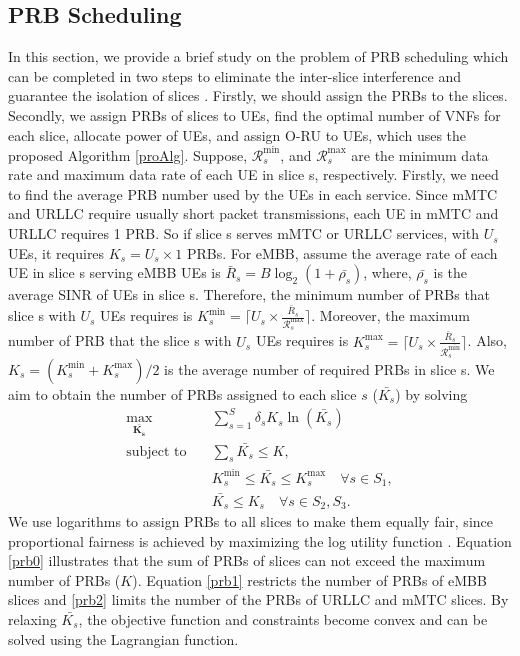 \documentclass[lettersize,journal]{IEEEtran}
\begin{document}
\subsection{PRB Scheduling}\label{prb}
\vspace{-1mm}
In this section, we provide a brief study on the problem of PRB scheduling which can be completed in two steps to eliminate the inter-slice interference and guarantee the isolation of slices \cite{marabissi2019highly}.
Firstly, we should assign the PRBs to the slices. Secondly, we assign PRBs of slices to UEs, find the optimal number of VNFs for each slice, allocate power of UEs, and assign O-RU to UEs, which uses the proposed Algorithm \ref{proAlg}.
Suppose, $\mathcal{R}_{{s}}^{\min}$, and $\mathcal{R}_{{s}}^{\text{max}}$ are the minimum data rate and maximum data rate of each UE in slice s, respectively.
Firstly, we need to find the average PRB number used by the UEs in each service. Since mMTC and URLLC require usually short packet transmissions, each UE in mMTC and URLLC requires 1 PRB. So if slice s serves mMTC or URLLC services, with $U_s$ UEs, it requires $K_s = U_s \times 1$ PRBs. For eMBB, assume the average rate of each UE in slice s serving eMBB UEs is $\bar{R}_s = B\log_2(1 + \bar{\rho_s})$, where, $\bar{\rho_s}$ is the average SINR of UEs in slice s. 
Therefore, the minimum number of PRBs that slice s with $U_s$ UEs requires is $K_s^{\min} = \lceil{U_s \times \frac{\bar{R}_s}{\mathcal{R}_{{s}}^{\text{max}}}}\rceil$. 
Moreover, the maximum number of PRB that the slice s with $U_s$ UEs requires is $K_s^{\text{max}} = \lceil{U_s \times \frac{\bar{R}_s}{\mathcal{R}_{{s}}^{\min}}}\rceil$. Also, $K_s = (K_s^{\min}+K_s^{\text{max}})/2$ is the average number of required PRBs in slice s.
We aim to obtain the number of PRBs assigned to each slice $s$ ($\bar{K_s}$) by solving 
\begin{subequations}\label{prob:prb}
\begin{alignat}{4}
\max\limits_{\boldsymbol{\bar{K_s}}} \quad &  \sum_{s=1}^{S}\delta_s K_s \ln(\bar{K_s}) \ \\
\text{subject to} \quad  & \sum_s{\bar{K_s}} \leq K
 \label{prb0}, \\
& K_s^{\min} \leq \bar{K_s}  \leq K_s^{\text{max}}  \quad \forall s \in S_1,\label{prb1} \\
&  \bar{K_s} \leq K_s  \quad \forall s \in S_2, S_3.\label{prb2}
\end{alignat}
\label{constraints}
\end{subequations}
We use logarithms to assign PRBs to all slices to make them equally fair, since proportional fairness is achieved by maximizing the log utility function \cite{marabissi2019highly}.
Equation \eqref{prb0} illustrates that the sum of PRBs of slices can not exceed the maximum number of PRBs ($K$).
Equation \eqref{prb1} restricts the number of PRBs of eMBB slices and \eqref{prb2} limits the number of the PRBs of URLLC and mMTC slices. By relaxing $\bar{K_s}$, the objective function and constraints become convex and can be solved using the Lagrangian function.
\vspace{-3mm}
\end{document}
